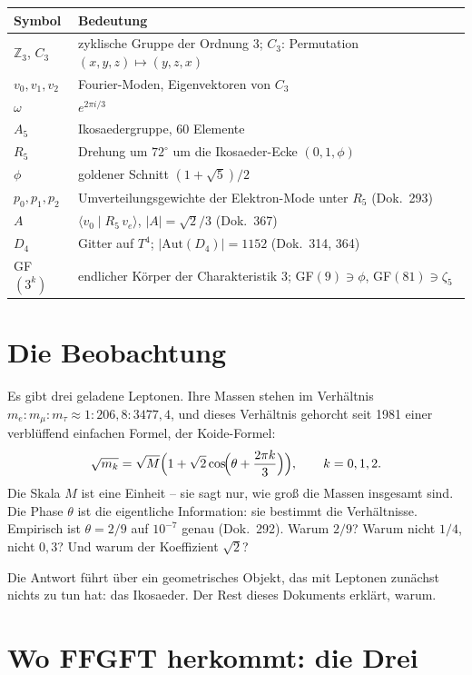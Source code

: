 \medskip
\begin{tabular}{@{}lp{11cm}@{}}
\toprule
\textbf{Symbol} & \textbf{Bedeutung} \\
\midrule
$\mathbb{Z}_3$, $C_3$ & zyklische Gruppe der Ordnung 3; $C_3$: Permutation $(x,y,z)\mapsto(y,z,x)$ \\
$v_0,v_1,v_2$ & Fourier-Moden, Eigenvektoren von $C_3$ \\
$\omega$ & $e^{2\pi i/3}$ \\
$A_5$ & Ikosaedergruppe, 60 Elemente \\
$R_5$ & Drehung um $72^\circ$ um die Ikosaeder-Ecke $(0,1,\phi)$ \\
$\phi$ & goldener Schnitt $(1+\sqrt5)/2$ \\
$p_0,p_1,p_2$ & Umverteilungsgewichte der Elektron-Mode unter $R_5$ (Dok.~293) \\
$A$ & $\langle v_0\mid R_5\,v_e\rangle$, $|A|=\sqrt2/3$ (Dok.~367) \\
$D_4$ & Gitter auf $T^4$; $|\text{Aut}(D_4)|=1152$ (Dok.~314, 364) \\
GF$(3^k)$ & endlicher Körper der Charakteristik 3; GF$(9)\ni\phi$, GF$(81)\ni\zeta_5$ \\
\bottomrule
\end{tabular}

\section{Die Beobachtung}

Es gibt drei geladene Leptonen. Ihre Massen stehen im Verhältnis
$m_e : m_\mu : m_\tau \approx 1 : 206{,}8 : 3477{,}4$, und dieses Verhältnis
gehorcht seit 1981 einer verblüffend einfachen Formel, der Koide-Formel:
\[
  \sqrt{m_k} = \sqrt{M}\Bigl(1 + \sqrt2\cos\!\Bigl(\theta + \frac{2\pi k}{3}\Bigr)\Bigr),
  \qquad k = 0,1,2.
\]
Die Skala $M$ ist eine Einheit -- sie sagt nur, wie groß die Massen insgesamt
sind. Die Phase $\theta$ ist die eigentliche Information: sie bestimmt die
Verhältnisse. Empirisch ist $\theta = 2/9$ auf $10^{-7}$ genau (Dok.~292).
Warum $2/9$? Warum nicht $1/4$, nicht $0{,}3$? Und warum der Koeffizient
$\sqrt2$?

Die Antwort führt über ein geometrisches Objekt, das mit Leptonen zunächst
nichts zu tun hat: das Ikosaeder. Der Rest dieses Dokuments erklärt, warum.

\section{Wo FFGFT herkommt: die Drei}

